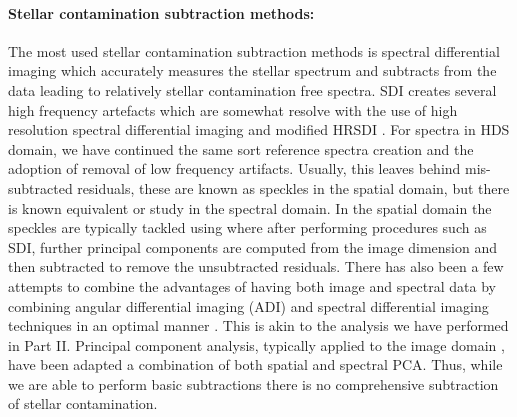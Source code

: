 \paragraph{Stellar contamination subtraction methods:\\}
The most used stellar contamination subtraction methods is spectral differential imaging \citep[SDI, ][]{2002SparksSDI} which accurately measures the stellar spectrum and subtracts from the data leading to relatively stellar contamination free spectra.
SDI creates several high frequency artefacts which are somewhat resolve with the use of high resolution spectral differential imaging \citep[HRSDI, ][]{2019Haffert} and modified HRSDI \citep[mHRSDI, ][]{2020Xie}.
For spectra in HDS domain, we have continued the same sort reference spectra creation and the adoption of removal of low frequency artifacts.
Usually, this leaves behind mis-subtracted residuals, these are known as speckles in the spatial domain, but there is known equivalent or study in the spectral domain. 
In the spatial domain the speckles are typically tackled using \citep[PCA based algorithms, ][]{2020Xie,2018Hunziker} where after performing procedures such as SDI, further principal components are computed from the image dimension and then subtracted to remove the unsubtracted residuals. 
There has also been a few attempts to combine the advantages of having both image and spectral data by combining angular differential imaging (ADI) and spectral differential imaging techniques in an optimal manner \cite{2021Kiefer}.
This is akin to the analysis we have performed in Part II.
Principal component analysis, typically applied to the image domain \cite{2012Amara}, have been adapted a combination of both spatial and spectral PCA.
Thus, while we are able to perform basic subtractions there is no comprehensive subtraction of stellar contamination.


